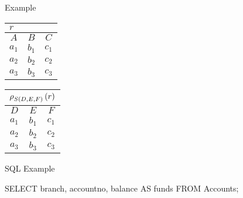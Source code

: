 \begin{multicols}{2}
\begin{CheatsheetEntryFrame}
        \SubsectionFrameRemoveSeparation
        \begin{RelAlgSubsection}{Example}
        \begin{center}
            {\footnotesize%
                \begin{tabular}{|ccc|}
                    \multicolumn{3}{l}{\normalsize $r$}
                        \\ \hline
                    \multicolumn{1}{|c}{$A$}
                        & \multicolumn{1}{c}{$B$}
                        & \multicolumn{1}{c|}{$C$}
                        \\ \hline\hline
                    $a_1$ & $b_1$ & $c_1$ \\
                    $a_2$ & $b_2$ & $c_2$ \\
                    $a_3$ & $b_3$ & $c_3$ \\ \hline
                \end{tabular}
                \qquad \qquad
                \begin{tabular}{|ccc|}
                    \multicolumn{3}{l}{\normalsize $\operatorname{\rho}_{S(D, E, F)}{(r)}$}
                        \\ \hline
                    \multicolumn{1}{|c}{$D$}
                        & \multicolumn{1}{c}{$E$}
                        & \multicolumn{1}{c|}{$F$}
                        \\ \hline\hline
                    $a_1$ & $b_1$ & $c_1$ \\
                    $a_2$ & $b_2$ & $c_2$ \\
                    $a_3$ & $b_3$ & $c_3$ \\ \hline
                \end{tabular}
            }
        \end{center}
        \end{RelAlgSubsection}
        \SubsectionFrameReduceSkip
        \begin{SqlSubsection}{SQL Example}
            \begin{CheatsheetSubsectionLst}
                SELECT branch, accountno, balance AS funds
                FROM Accounts;
            \end{CheatsheetSubsectionLst}

            \medskip


\end{SqlSubsection}
\end{CheatsheetEntryFrame}
\end{multicols}
